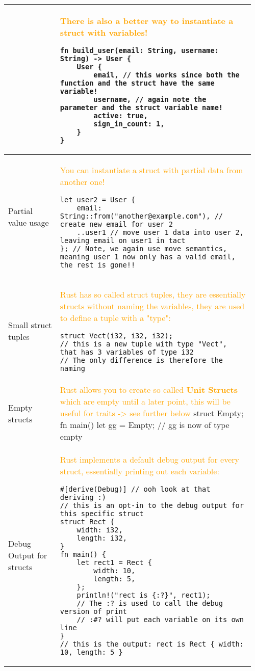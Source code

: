\documentclass[main.tex,fontsize=8pt,paper=a4,paper=portrait,DIV=calc,]{scrartcl}
\begin{document}
\begin{table}[ht!]
\begin{tabular}{|m{0.2\linewidth}|m{0.755\linewidth}|}
\hline
&
\textcolor{orange}{There is also a better way to instantiate a struct with variables!}\newline
\begin{lstlisting}
fn build_user(email: String, username: String) -> User {
    User {
        email, // this works since both the function and the struct have the same variable!
        username, // again note the parameter and the struct variable name!
        active: true,
        sign_in_count: 1,
    }
}
\end{lstlisting}\\
\hline
Partial value usage & 
\textcolor{orange}{You can instantiate a struct with partial data from another one!}\newline
\begin{lstlisting}
let user2 = User {
    email: String::from("another@example.com"), // create new email for user 2
    ..user1 // move user 1 data into user 2, leaving email on user1 in tact
}; // Note, we again use move semantics, meaning user 1 now only has a valid email, the rest is gone!!
\end{lstlisting}\\
\hline
Small struct tuples & 
\textcolor{orange}{Rust has so called struct tuples, they are essentially structs without naming the variables, \newline
they are used to define a tuple with a "type":}\newline
\begin{lstlisting}
struct Vect(i32, i32, i32);
// this is a new tuple with type "Vect", that has 3 variables of type i32 
// The only difference is therefore the naming
\end{lstlisting}\\
\hline
Empty structs &
\textcolor{orange}{Rust allows you to create so called \textbf{Unit Structs} which are empty until a later point,
this will be useful for traits -> see further below}\newline
struct Empty;
fn main() {
    let gg = Empty;
    // gg is now of type empty
}\\
\hline
Debug Output for structs & 
\textcolor{orange}{Rust implements a default debug output for every struct, essentially printing out each variable:}\newline
\begin{lstlisting}
#[derive(Debug)] // ooh look at that deriving :) 
// this is an opt-in to the debug output for this specific struct
struct Rect {
    width: i32,
    length: i32,
}
fn main() {
    let rect1 = Rect {
        width: 10,
        length: 5,
    };
    println!("rect is {:?}", rect1);
    // The :? is used to call the debug version of print
    // :#? will put each variable on its own line
}
// this is the output: rect is Rect { width: 10, length: 5 }
\end{lstlisting}\\
\hline
\end{tabular}

\end{table}
\end{document}
